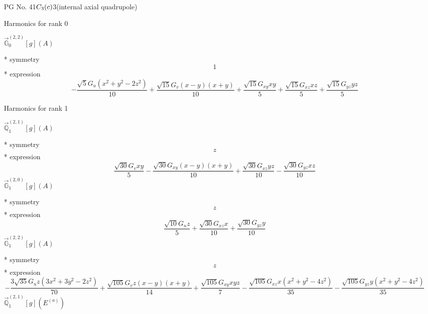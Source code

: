 \documentclass[fleqn,8pt]{jsarticle}
\begin{document}
\setcounter{MaxMatrixCols}{32}

\renewcommand{\tablename}{Table~}
\renewcommand{\figurename}{Figure~}
\begin{center}
\LARGE
PG No. 41\quad$C_{\rm 3}(c)$\quad$3$\quad[ trigonal ] (internal axial quadrupole)
\end{center}

\noindent * Harmonics for rank 0

\noindent\quad $\vec{\mathbb{G}}_{0}^{(2,2)}[g](A)$

\noindent\quad ** symmetry
\begin{dmath*}
1
\end{dmath*}
\noindent\quad ** expression
\begin{dmath*}
- \frac{\sqrt{5} G_{u} \left(x^{2} + y^{2} - 2 z^{2}\right)}{10} + \frac{\sqrt{15} G_{v} \left(x - y\right) \left(x + y\right)}{10} + \frac{\sqrt{15} G_{xy} x y}{5} + \frac{\sqrt{15} G_{xz} x z}{5} + \frac{\sqrt{15} G_{yz} y z}{5}
\end{dmath*}

\noindent * Harmonics for rank 1

\noindent\quad $\vec{\mathbb{Q}}_{1}^{(2,1)}[g](A)$

\noindent\quad ** symmetry
\begin{dmath*}
z
\end{dmath*}
\noindent\quad ** expression
\begin{dmath*}
\frac{\sqrt{30} G_{v} x y}{5} - \frac{\sqrt{30} G_{xy} \left(x - y\right) \left(x + y\right)}{10} + \frac{\sqrt{30} G_{xz} y z}{10} - \frac{\sqrt{30} G_{yz} x z}{10}
\end{dmath*}
\noindent\quad $\vec{\mathbb{G}}_{1}^{(2,0)}[g](A)$

\noindent\quad ** symmetry
\begin{dmath*}
z
\end{dmath*}
\noindent\quad ** expression
\begin{dmath*}
\frac{\sqrt{10} G_{u} z}{5} + \frac{\sqrt{30} G_{xz} x}{10} + \frac{\sqrt{30} G_{yz} y}{10}
\end{dmath*}
\noindent\quad $\vec{\mathbb{G}}_{1}^{(2,2)}[g](A)$

\noindent\quad ** symmetry
\begin{dmath*}
z
\end{dmath*}
\noindent\quad ** expression
\begin{dmath*}
- \frac{3 \sqrt{35} G_{u} z \left(3 x^{2} + 3 y^{2} - 2 z^{2}\right)}{70} + \frac{\sqrt{105} G_{v} z \left(x - y\right) \left(x + y\right)}{14} + \frac{\sqrt{105} G_{xy} x y z}{7} - \frac{\sqrt{105} G_{xz} x \left(x^{2} + y^{2} - 4 z^{2}\right)}{35} - \frac{\sqrt{105} G_{yz} y \left(x^{2} + y^{2} - 4 z^{2}\right)}{35}
\end{dmath*}
\noindent\quad $\vec{\mathbb{Q}}_{1}^{(2,1)}[g](E^{(a)})$
\end{document}
